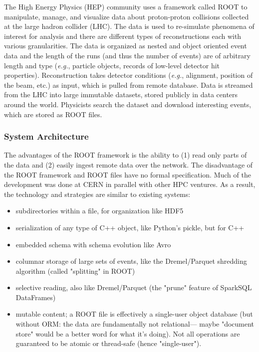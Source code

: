 The High Energy Physics (HEP) community uses a framework called ROOT to
manipulate, manage, and visualize data about proton-proton collisions
collected at the large hadron collider (LHC). The data is used to re-simulate
phenomena of interest for analysis and there are different types of
reconstructions each with various granularities. The data is organized as
nested and object oriented event data and the length of the runs (and thus
the number of events) are of arbitrary length and type ({\it e.g.},
particle objects, records of low-level detector hit properties).
Reconstruction takes detector conditions ({\it e.g.}, alignment, position of
the beam, etc.) as input, which is pulled from remote database.  Data is
streamed from the LHC into large immutable datasets, stored publicly in
data centers around the world.  Physicists search the dataset and download
interesting events, which are stored as ROOT files. 

\subsubsection{System Architecture}

The advantages of the ROOT framework is the ability to (1) read only parts
of the data and (2) easily ingest remote data over the network. The
disadvantage of the ROOT framework and ROOT files have no formal
specification. Much of the development was done at CERN in parallel with
other HPC ventures. As a result, the technology and strategies are similar
to existing systems:

\begin{itemize}

  \item subdirectories within a file, for organization like HDF5

  \item serialization of any type of C++ object, like Python's pickle, but for
  C++

  \item embedded schema with schema evolution like Avro

  \item columnar storage of large sets of events, like the Dremel/Parquet
  shredding algorithm (called "splitting" in ROOT)

  \item selective reading, also like Dremel/Parquet (the "prune" feature of
  SparkSQL DataFrames)

  \item mutable content; a ROOT file is effectively a single-user object
  database (but without ORM: the data are fundamentally not relational— maybe
  "document store" would be a better word for what it's doing). Not all
  operations are guaranteed to be atomic or thread-safe (hence "single-user").

\end{itemize}

